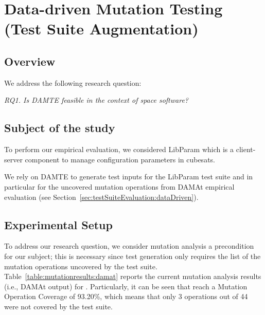 \clearpage
\section{Data-driven Mutation Testing (Test Suite Augmentation)}
\label{sec:testGeneration:dataDriven}

\STARTCHANGEDFINAL

\subsection{Overview}

We address the following research question:

\emph{RQ1. Is DAMTE feasible in the context of space software?}

\subsection{Subject of the study}

To perform our empirical evaluation, we considered LibParam which is a client-server component to manage configuration parameters in cubesats. 

We rely on DAMTE to generate test inputs for the LibParam test suite and in particular for the uncovered mutation operations from DAMAt empirical evaluation (see Section~\ref{sec:testSuiteEvaluation:dataDriven}).

\subsection{Experimental Setup}

To address our research question, we consider mutation analysis a precondition for our subject; this is necessary since test generation only requires the list of the mutation operations uncovered by the test suite. Table~\ref{table:mutationresults:damat} reports the current mutation analysis results (i.e., DAMAt output) for \PARAM.
Particularly, it can be seen that \PARAM reach a Mutation Operation Coverage of 93.20\%, which means that only 3 operations out of 44 were not covered by the test suite.

